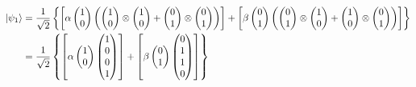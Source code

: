 \begin{equation}
	\begin{split}
\ket{\psi_1} &= \frac{1}{\sqrt{2}}\left\{\left[\alpha \begin{pmatrix}
1 \\
0 
\end{pmatrix}  \left(\begin{pmatrix}
1 \\
0 
\end{pmatrix} \otimes \begin{pmatrix}
1 \\
0
\end{pmatrix} + \begin{pmatrix}
0 \\
1
\end{pmatrix} \otimes \begin{pmatrix}
0 \\
1
\end{pmatrix}\right)\right] + \left[\beta \begin{pmatrix}
0 \\
1
\end{pmatrix}  \left(\begin{pmatrix}
0 \\
1 
\end{pmatrix} \otimes \begin{pmatrix}
1 \\
0
\end{pmatrix} + \begin{pmatrix}
1 \\
0
\end{pmatrix} \otimes \begin{pmatrix}
0 \\
1
\end{pmatrix}\right)\right] \right\} \\
&=\frac{1}{\sqrt{2}}\left\{\left[\alpha \begin{pmatrix}
1 \\
0 
\end{pmatrix}  \begin{pmatrix}
1 \\
0 \\
0 \\
1
\end{pmatrix}\right] + \left[\beta \begin{pmatrix} 
0 \\
1
\end{pmatrix} \begin{pmatrix}
0 \\
1 \\
1 \\
0
\end{pmatrix}\right]\right\}
  \end{split}
\end{equation}


